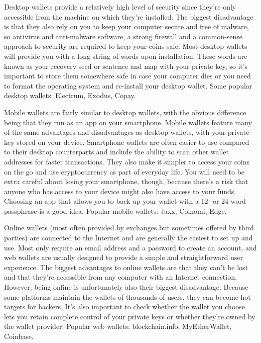 Desktop wallets provide a relatively high level of security since they’re only accessible from the machine on which they’re installed. The biggest disadvantage is that they also rely on you to keep your computer secure and free of malware, so antivirus and anti-malware software, a strong firewall and a common-sense approach to security are required to keep your coins safe. Most desktop wallets will provide you with a long string of words upon installation. These words are known as your recovery seed or sentence and map with your private key, so it’s important to store them somewhere safe in case your computer dies or you need to format the operating system and re-install your desktop wallet. Some popular desktop wallets: Electrum, Exodus, Copay.

Mobile wallets are fairly similar to desktop wallets, with the obvious difference being that they run as an app on your smartphone. Mobile wallets feature many of the same advantages and disadvantages as desktop wallets, with your private key stored on your device.
Smartphone wallets are often easier to use compared to their desktop counterparts and include the ability to scan other wallet addresses for faster transactions. They also make it simpler to access your coins on the go and use cryptocurrency as part of everyday life. You will need to be extra careful about losing your smartphone, though, because there’s a risk that anyone who has access to your device might also have access to your funds. Choosing an app that allows you to back up your wallet with a 12- or 24-word passphrase is a good idea. Popular mobile wallets: Jaxx, Coinomi, Edge.

Online wallets (most often provided by exchanges but sometimes offered by third parties) are connected to the Internet and are generally the easiest to set up and use. Most only require an email address and a password to create an account, and web wallets are usually designed to provide a simple and straightforward user experience. The biggest advantages to online wallets are that they can’t be lost and that they’re accessible from any computer with an Internet connection. However, being online is unfortunately also their biggest disadvantage. Because some platforms maintain the wallets of thousands of users, they can become hot targets for hackers. It’s also important to check whether the wallet you choose lets you retain complete control of your private keys or whether they’re owned by the wallet provider. Popular web wallets: blockchain.info, MyEtherWallet, Coinbase.

